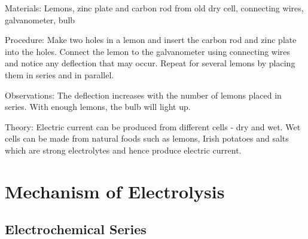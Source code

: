 \begin{multicols}{2}
\begin{description*}
\item[Materials:]{Lemons, zinc plate and carbon rod from old dry cell, connecting wires, galvanometer, bulb}
\item[Procedure:]{Make two holes in a lemon and insert the carbon rod and zinc plate into the holes. Connect the lemon to the galvanometer using connecting wires and notice any deflection that may occur. Repeat for several lemons by placing them in series and in parallel.}
\item[Observations:]{The deflection increases with the number of lemons placed in series. With enough lemons, the bulb will light up.}
\item[Theory:]{Electric current can be produced from different cells - dry and wet. Wet cells can be made from natural foods such as lemons, Irish potatoes and salts which are strong electrolytes and hence produce electric current.}
\end{description*}


\section*{Mechanism of Electrolysis}


\subsection{Electrochemical Series}



\end{multicols}
